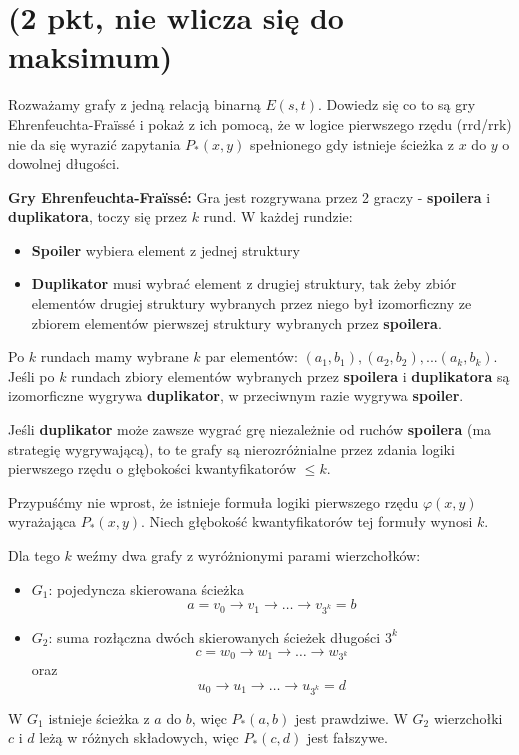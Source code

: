 \documentclass{article}
\begin{document}
\section{(2 pkt, nie wlicza się do maksimum)}
Rozważamy grafy z jedną relacją binarną $E(s, t)$. Dowiedz się co to są gry Ehrenfeuchta-Fraïssé i pokaż z ich pomocą, że w logice pierwszego rzędu (rrd/rrk) nie da się wyrazić zapytania $P_*(x, y)$ spełnionego gdy istnieje ścieżka z $x$ do $y$ o dowolnej długości.

\textbf{Gry Ehrenfeuchta-Fraïssé:} Gra jest rozgrywana przez 2 graczy - \textbf{spoilera} i \textbf{duplikatora}, toczy się przez $k$ rund. W każdej rundzie:
\begin{itemize}
        \item \textbf{Spoiler} wybiera element z jednej struktury
        \item \textbf{Duplikator} musi wybrać element z drugiej struktury, tak żeby zbiór elementów drugiej struktury wybranych przez niego był izomorficzny ze zbiorem elementów pierwszej struktury wybranych przez \textbf{spoilera}.
\end{itemize}
Po $k$ rundach mamy wybrane $k$ par elementów: $(a_1, b_1), (a_2, b_2), ... (a_k, b_k)$.
Jeśli po $k$ rundach zbiory elementów wybranych przez \textbf{spoilera} i \textbf{duplikatora} są izomorficzne wygrywa \textbf{duplikator}, w przeciwnym razie wygrywa \textbf{spoiler}.

Jeśli \textbf{duplikator} może zawsze wygrać grę niezależnie od ruchów \textbf{spoilera} (ma strategię wygrywającą), to te grafy są nierozróżnialne przez zdania logiki pierwszego rzędu o głębokości kwantyfikatorów $\leq k$.

Przypuśćmy nie wprost, że istnieje formuła logiki pierwszego rzędu $\varphi(x, y)$ wyrażająca $P_*(x, y)$. Niech głębokość kwantyfikatorów tej formuły wynosi $k$.

Dla tego $k$ weźmy dwa grafy z wyróżnionymi parami wierzchołków:
\begin{itemize}
        \item $G_1$: pojedyncza skierowana ścieżka
        \[
                a = v_0 \rightarrow v_1 \rightarrow \ldots \rightarrow v_{3^k} = b
        \]
        \item $G_2$: suma rozłączna dwóch skierowanych ścieżek długości $3^k$
        \[
                c = w_0 \rightarrow w_1 \rightarrow \ldots \rightarrow w_{3^k}
        \]
        oraz
        \[
                u_0 \rightarrow u_1 \rightarrow \ldots \rightarrow u_{3^k} = d
        \]
\end{itemize}
W $G_1$ istnieje ścieżka z $a$ do $b$, więc $P_*(a,b)$ jest prawdziwe. W $G_2$ wierzchołki $c$ i $d$ leżą w różnych składowych, więc $P_*(c,d)$ jest fałszywe.
\end{document}
